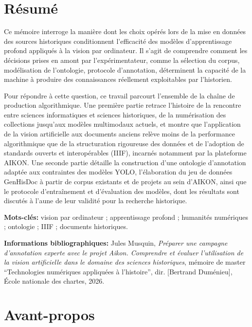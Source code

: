 \documentclass[12pt,twoside]{book}
\begin{document}
	\chapter{Résumé}
\medskip
		Ce mémoire interroge la manière dont les choix opérés lors de la \og mise en données \fg des sources historiques conditionnent l'efficacité des modèles d'apprentissage profond appliqués à la vision par ordinateur. Il s'agit de comprendre comment les décisions prises en amont par l'expérimentateur, comme la sélection du corpus, modélisation de l'ontologie, protocole d'annotation, déterminent la capacité de la machine à produire des connaissances réellement exploitables par l'historien.
		
		Pour répondre à cette question, ce travail parcourt l'ensemble de la chaîne de production algorithmique. Une première partie retrace l'histoire de la rencontre entre sciences informatiques et sciences historiques, de la numérisation des collections jusqu'aux modèles multimodaux actuels, et montre que l'application de la vision artificielle aux documents anciens relève moins de la performance algorithmique que de la structuration rigoureuse des données et de l'adoption de standards ouverts et interopérables (IIIF), incarnés notamment par la plateforme AIKON. Une seconde partie détaille la construction d'une ontologie d'annotation adaptée aux contraintes des modèles YOLO, l'élaboration du jeu de données GenHisDoc à partir de corpus existants et de projets au sein d'AIKON, ainsi que le protocole d'entraînement et d'évaluation des modèles, dont les résultats sont discutés à l'aune de leur validité pour la recherche historique.
	
	\textbf{Mots-clés:} vision par ordinateur ; apprentissage profond ; humanités numériques ; ontologie ; IIIF ; documents historiques.
	
	\textbf{Informations bibliographiques:} Jules Musquin, \textit{Préparer une campagne d'annotation experte avec le projet Aikon. Comprendre et évaluer l'utilisation de la vision artificielle dans le domaine des sciences historiques}, mémoire de master \enquote{Technologies numériques appliquées à l'histoire}, dir. [Bertrand Duménieu], École nationale des chartes, 2026.
	
	\newpage{\pagestyle{empty}\cleardoublepage}

\tableofcontents
	
\chapter{Avant-propos}
\end{document}
